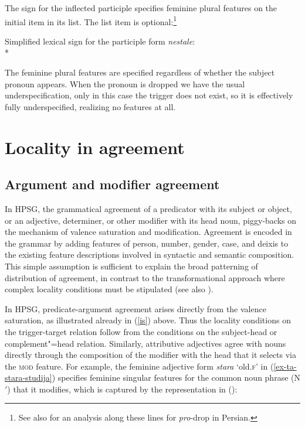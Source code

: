 \documentclass[output=paper,biblatex,babelshorthands,newtxmath,draftmode,colorlinks,citecolor=brown]{langscibook}
\begin{document}
\noindent
The sign for the inflected participle specifies feminine plural features on the initial item in its
\argst list.  The \subj list item is optional:\footnote{See also 
    for an analysis along these lines for \emph{pro}-drop in Persian.}

\begin{exe} 
\ex		\label{nestale} 
Simplified lexical sign for the participle form \textit{nestale}:\\*
\end{exe}

\noindent
The feminine plural features are specified regardless of whether  the subject pronoun appears.  When the pronoun is dropped we have the usual underspecification, only in this case the trigger does not exist, so it is effectively fully underspecified, realizing no features at all.  


\section{Locality in agreement} 
\label{agreement:sec-locality}

\subsection{Argument and modifier agreement}
\label{arg-mod-agr}

In HPSG, the grammatical agreement of a predicator with its subject or object, or an adjective, determiner, or other modifier with its head noun, piggy-backs on the mechanism of valence saturation and modification.   Agreement is encoded in the grammar by adding features of person, number, gender, case, and deixis to the existing feature descriptions involved in syntactic and semantic composition.  This simple assumption is sufficient to explain the broad patterning of distribution of agreement, in contrast to the transformational approach where complex locality conditions must be stipulated (see also ).   

In HPSG, predicate-argument agreement arises directly from the valence saturation, as illustrated
already in (\ref{is}) above.  Thus the locality conditions on the trigger-target relation follow
from the conditions on the subject-head or complement"=head relation.   Similarly, attributive
adjectives agree with nouns directly through the composition of the modifier with the head that it
selects via the \textsc{mod} feature.  For example, the  feminine adjective form
\textit{stara} `old.\textsc{f}' in (\ref{ex-ta-stara-studija}) specifies feminine singular features
for the common noun phrase (N$'$) that it modifies, which is captured by the representation
  in ():
\end{document}
